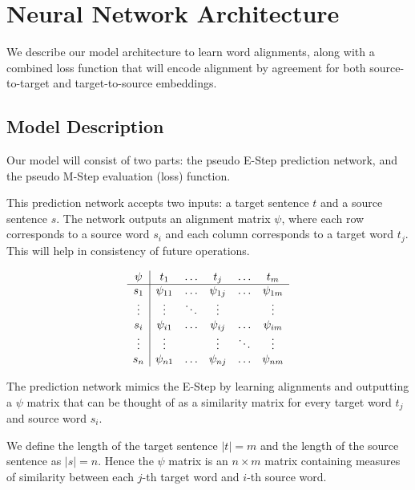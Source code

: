 \documentclass[twoside,twocolumn]{article}
\begin{document}

\section{Neural Network Architecture}

We describe our model architecture to learn word alignments, along with
a combined loss function that will encode alignment by
agreement for both source-to-target and target-to-source embeddings.


\subsection{Model Description}

Our model will consist of two parts: the pseudo E-Step prediction network, and
the pseudo M-Step evaluation (loss) function.

This prediction network accepts two inputs: a target sentence $t$ and a source
sentence $s$. The network outputs an alignment matrix $\psi$, where
each row corresponds to a source word $s_i$ and each column corresponds to a
target word $t_j$. This will help in consistency of future operations.

\begin{equation}
  \centering
\begin{array}{c|ccccc}
\psi & t_1       & \hdots & t_j       & \hdots & t_m       \\ \hline
s_1  & \psi_{11} & \hdots & \psi_{1j} & \hdots & \psi_{1m} \\
\vdots  & \vdots & \ddots & \vdots &  & \vdots \\
s_i  & \psi_{i1} & \hdots & \psi_{ij} & \hdots & \psi_{im} \\
\vdots  & \vdots &  & \vdots & \ddots & \vdots \\
s_n  & \psi_{n1} & \hdots & \psi_{nj} & \hdots & \psi_{nm}
\end{array}
\end{equation}

The prediction network mimics the E-Step by learning alignments and outputting
a $\psi$ matrix that can be thought of as a similarity matrix for every target
word $t_j$ and source word $s_i$.

We define the length of the target sentence
$|t| = m$ and the length of the source sentence as $|s|=n$. Hence the $\psi$
matrix is an $n \times m$ matrix containing measures of similarity between each
$j$-th target word and $i$-th source word.
\end{document}
